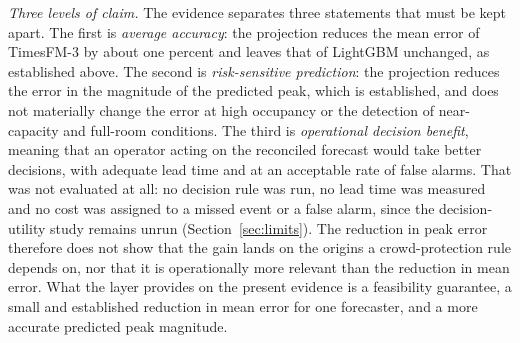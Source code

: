\documentclass[utf8]{FrontiersinHarvard}
\newif\ifsecondrevisionmarkup
\newcommand{\rev}[1]{\ifsecondrevisionmarkup\textcolor{revisiontwo}{#1}\else#1\fi}
\theoremstyle{plain}
\theoremstyle{definition}
\theoremstyle{remark}
\begin{document}
\rev{\emph{Three levels of claim.} The evidence separates three statements that must be kept apart. The first is \emph{average accuracy}: the projection reduces the mean error of TimesFM-3 by about one percent and leaves that of LightGBM unchanged, as established above. The second is \emph{risk-sensitive prediction}: the projection reduces the error in the magnitude of the predicted peak, which is established, and does not materially change the error at high occupancy or the detection of near-capacity and full-room conditions. The third is \emph{operational decision benefit}, meaning that an operator acting on the reconciled forecast would take better decisions, with adequate lead time and at an acceptable rate of false alarms. That was not evaluated at all: no decision rule was run, no lead time was measured and no cost was assigned to a missed event or a false alarm, since the decision-utility study remains unrun (Section~\ref{sec:limits}). The reduction in peak error therefore does not show that the gain lands on the origins a crowd-protection rule depends on, nor that it is operationally more relevant than the reduction in mean error. What the layer provides on the present evidence is a feasibility guarantee, a small and established reduction in mean error for one forecaster, and a more accurate predicted peak magnitude.}
\end{document}

